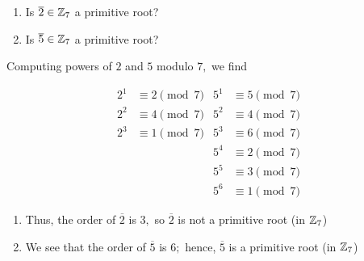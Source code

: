 \documentclass[letterpaper, 11 pt]{ximera}
\theoremstyle{definition}
\begin{document}
\begin{example}\label{ex:prime_roots_7}
    
    \begin{enumerate}
        \item Is $\overline{2}\in\mathbb Z_7$ a primitive root?
        \item Is $\overline{5}\in\mathbb Z_7$ a primitive root?
    \end{enumerate}
    
    \begin{solution} Computing powers of $2$ and $5$ modulo $7,$ we find 
        
        \begin{align*}
            2^1 & \equiv 2\pmod{7}  
                &5^1&\equiv 5\pmod{7}\\
            2^2 & \equiv 4\pmod{7}  
                &5^2&\equiv 4\pmod{7}\\
            2^3 & \equiv 1\pmod{7}  
                &5^3&\equiv 6\pmod{7}\\
            &   &5^4&\equiv 2\pmod{7}\\
            &   &5^5&\equiv 3\pmod{7}\\            
            &   &5^6&\equiv 1\pmod{7}\
        \end{align*}
        \begin{enumerate}
            \item Thus, the order of $\overline{2}$ is $3,$ so $\overline{2}$ is not a primitive root (in $\mathbb Z_7$) 
            \item We see that the order of $\overline{5}$ is $6;$ hence, $\overline{5}$ is a primitive root (in $\mathbb Z_7$) 
        \end{enumerate}
    \end{solution}
\end{example}
\end{document}
